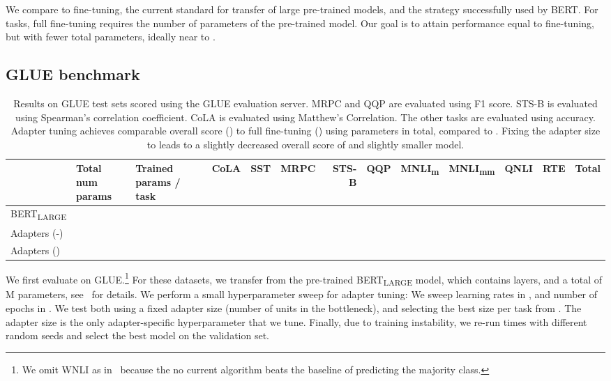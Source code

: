 \documentclass{article}
\begin{document}
We compare to fine-tuning, the current standard for transfer of large pre-trained models,
and the strategy successfully used by BERT.
For  tasks, full fine-tuning requires  the number of parameters of the pre-trained model.
Our goal is to attain performance equal to fine-tuning, but with fewer total parameters, ideally near to .

\subsection{GLUE benchmark\label{sec:glue}}

\begin{table*}[t]
\centering
\begin{adjustbox}{max width=\textwidth}
\begin{tabular}{l|ll|rrrrrrrrr|r}
\toprule
{} & \pbox{3cm}{Total num\\ params} & \pbox{3cm}{Trained \\ params / task} & CoLA &     SST &    MRPC &   STS-B &     QQP & MNLI\textsubscript{m} & MNLI\textsubscript{mm} &    QNLI &     RTE &   Total \\
\midrule
BERT\textsubscript{LARGE} &   &    &   &   &   &   &   &   &   &   &   &   \\
Adapters (-)      &   &    &   &   &   &   &   &   &   &   &   &   \\
Adapters ()           &   &    &   &   &   &   &   &   &   &   &   &   \\
\bottomrule
\end{tabular}
\end{adjustbox}
\caption{
Results on GLUE test sets scored using the GLUE evaluation server.
MRPC and QQP are evaluated using F1 score.
STS-B is evaluated using Spearman's correlation coefficient.
CoLA is evaluated using Matthew's Correlation.
The other tasks are evaluated using accuracy.
Adapter tuning achieves comparable overall score () to full fine-tuning () using  parameters in total, compared to .
Fixing the adapter size to  leads to a slightly decreased overall score of  and slightly smaller model.
\label{tab:glue}}
\end{table*}

We first evaluate on GLUE.\footnote{
We omit WNLI as in~\citet{devlin2018bert} because the no current algorithm beats the baseline of predicting the majority class.}
For these datasets, we transfer from the pre-trained BERT\textsubscript{LARGE} model,
which contains  layers, and a total of M parameters, see~\citet{devlin2018bert} for details.
We perform a small hyperparameter sweep for adapter tuning:
We sweep learning rates in , and number of epochs in .
We test both using a fixed adapter size (number of units in the bottleneck),
and selecting the best size per task from .
The adapter size is the only adapter-specific hyperparameter that we tune.
Finally, due to training instability, we re-run  times with different random seeds and select the best model on the validation set.
\end{document}
